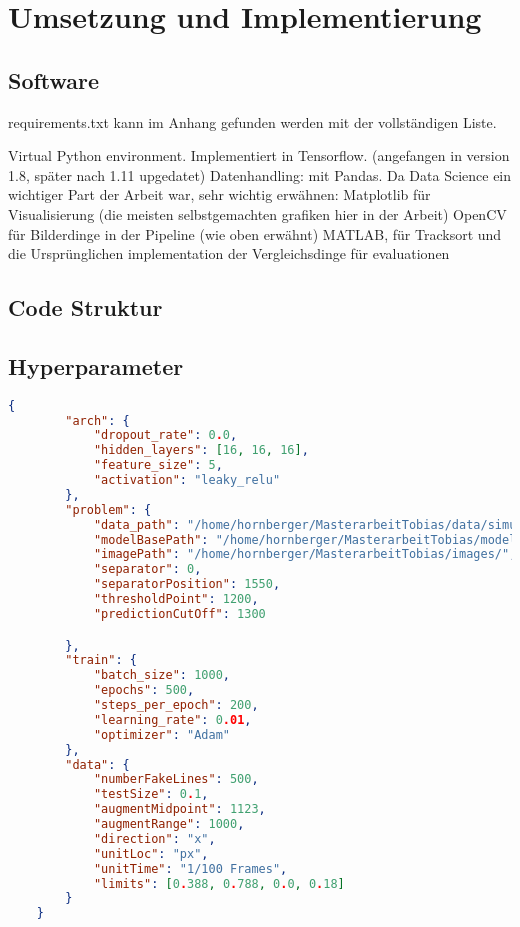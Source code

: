 \chapter{Umsetzung und Implementierung}

\section{Software}

requirements.txt kann im Anhang gefunden werden mit der vollständigen Liste.

Virtual Python environment.
Implementiert in Tensorflow. (angefangen in version 1.8, später nach 1.11 upgedatet)
Datenhandling: mit Pandas. Da Data Science ein wichtiger Part der Arbeit war, sehr wichtig
erwähnen:
Matplotlib für Visualisierung (die meisten selbstgemachten grafiken hier in der Arbeit)
OpenCV für Bilderdinge in der Pipeline (wie oben erwähnt)
MATLAB, für Tracksort und die Ursprünglichen implementation der Vergleichsdinge für evaluationen 




\section{Code Struktur}


\section{Hyperparameter}

\begin{lstlisting}[language=json,firstnumber=1, caption={Beispiel eines Hyperparameter Files in JSON}, captionpos=b, label=lst-hyperparam]
    {
        "arch": {
            "dropout_rate": 0.0,
            "hidden_layers": [16, 16, 16],
            "feature_size": 5,
            "activation": "leaky_relu"
        },
        "problem": {
            "data_path": "/home/hornberger/MasterarbeitTobias/data/simulated/SpheresDownsampled",
            "modelBasePath": "/home/hornberger/MasterarbeitTobias/models/simulated/",
            "imagePath": "/home/hornberger/MasterarbeitTobias/images/",
            "separator": 0,
            "separatorPosition": 1550,
            "thresholdPoint": 1200,
            "predictionCutOff": 1300

        },
        "train": {
            "batch_size": 1000,
            "epochs": 500,
            "steps_per_epoch": 200,
            "learning_rate": 0.01,
            "optimizer": "Adam"
        },
        "data": {
            "numberFakeLines": 500,
            "testSize": 0.1,
            "augmentMidpoint": 1123,
            "augmentRange": 1000,
            "direction": "x",
            "unitLoc": "px",
            "unitTime": "1/100 Frames",    
            "limits": [0.388, 0.788, 0.0, 0.18]
        }
    }

    
\end{lstlisting}
    

